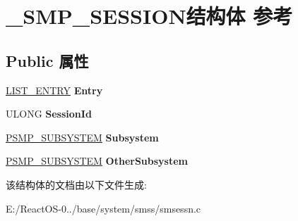 \hypertarget{struct___s_m_p___s_e_s_s_i_o_n}{}\section{\+\_\+\+S\+M\+P\+\_\+\+S\+E\+S\+S\+I\+O\+N结构体 参考}
\label{struct___s_m_p___s_e_s_s_i_o_n}
\subsection*{Public 属性}
\begin{DoxyCompactItemize}
\item 
\mbox{\label{struct___s_m_p___s_e_s_s_i_o_n_aa18bf451550995ccdf1117e1c12b53a1}} 
\hyperlink{struct___l_i_s_t___e_n_t_r_y}{L\+I\+S\+T\+\_\+\+E\+N\+T\+RY} {\bfseries Entry}
\item 
\mbox{\label{struct___s_m_p___s_e_s_s_i_o_n_afe64f9abb8d6f3472eb4f4bbaaa5a83b}} 
U\+L\+O\+NG {\bfseries Session\+Id}
\item 
\mbox{\label{struct___s_m_p___s_e_s_s_i_o_n_a890582bdef365dc28a84df1d4eca9758}} 
\hyperlink{struct___s_m_p___s_u_b_s_y_s_t_e_m}{P\+S\+M\+P\+\_\+\+S\+U\+B\+S\+Y\+S\+T\+EM} {\bfseries Subsystem}
\item 
\mbox{\label{struct___s_m_p___s_e_s_s_i_o_n_afe0d1089cbdff166770c17d773b19c55}} 
\hyperlink{struct___s_m_p___s_u_b_s_y_s_t_e_m}{P\+S\+M\+P\+\_\+\+S\+U\+B\+S\+Y\+S\+T\+EM} {\bfseries Other\+Subsystem}
\end{DoxyCompactItemize}


该结构体的文档由以下文件生成\+:\begin{DoxyCompactItemize}
\item 
E\+:/\+React\+O\+S-\/0../base/system/smss/smsessn.\+c\end{DoxyCompactItemize}
